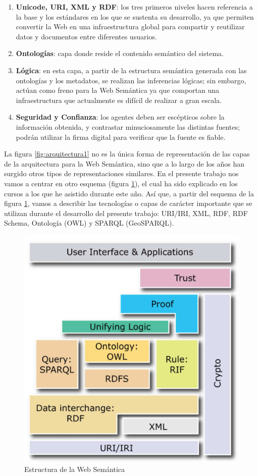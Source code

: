 \begin{enumerate}
	\item \textbf{Unicode, URI, XML y RDF}: los tres primeros niveles hacen referencia a la base y los estándares en los que se sustenta su desarrollo, ya que permiten convertir la Web en una infraestructura global para compartir y reutilizar datos y documentos entre diferentes usuarios.
	
	\item \textbf{Ontologías}: capa donde reside el contenido semántico del sistema. 
	
	\item \textbf{Lógica}: en esta capa, a partir de la estructura semántica generada con las ontologías y los metadatos, se realizan las inferencias lógicas; sin embargo, actúan como freno para la Web Semántica ya que comportan una infraestructura que actualmente es difícil de realizar a gran escala. 
	
	\item \textbf{Seguridad y Confianza}: los agentes deben ser escépticos sobre la información obtenida, y contrastar minuciosamente las distintas fuentes; podrán utilizar la firma digital para verificar que la fuente es fiable. 
\end{enumerate}



La figura \ref{fig:arquitectura1} no es la única forma de representación de las capas de la arquitectura para la Web Semántica, sino que a lo largo de los años han surgido otros tipos de representaciones similares. En el presente trabajo nos vamos a centrar en otro esquema (figura \ref{fig:arquitectura2}), el cual ha sido explicado en los cursos a los que he asistido durante este año. Así que, a partir del esquema de la figura \ref{fig:arquitectura2}, vamos a describir las tecnologías o capas de carácter importante que se utilizan durante el desarrollo del presente trabajo: URI/IRI, XML, RDF, RDF Schema, Ontología (OWL) y SPARQL (GeoSPARQL).

\begin{figure}[H]
	\centering
	\includegraphics[width=0.5\linewidth]{imagenes/capitulo3/arquitectura2}
	\caption{Estructura de la Web Semántica \cite{apuntes-clase-jose}}
	\label{fig:arquitectura2}
\end{figure}


